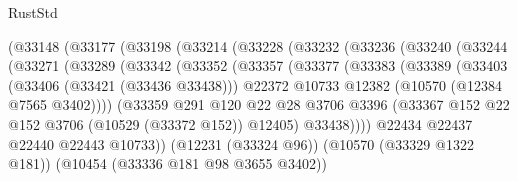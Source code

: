 \begin{lexlean}{RustStd}
\begin{coremodule}
                      (@33148
                        (@33177
                          (@33198
                            (@33214
                              (@33228
                                (@33232
                                  (@33236
                                    (@33240
                                      (@33244
                                        (@33271
                                          (@33289
                                            (@33342
                                              (@33352
                                                (@33357
                                                  (@33377
                                                    (@33383
                                                      (@33389
                                                        (@33403
                                                          (@33406 (@33421 (@33436 @33438)))
                                                          @22372
                                                          @10733
                                                          @12382
                                                          (@10570 (@12384 @7565 @3402))))
                                                      (@33359
                                                        @291
                                                        @120
                                                        @22
                                                        @28
                                                        @3706
                                                        @3396
                                                        (@33367
                                                          @152
                                                          @22
                                                          @152
                                                          @3706
                                                          (@10529 (@33372 @152))
                                                          @12405)
                                                        @33438))))
                                                @22434
                                                @22437
                                                @22440
                                                @22443
                                                @10733))
                                            (@12231 (@33324 @96))
                                            (@10570 (@33329 @1322 @181))
                                            (@10454 (@33336 @181 @98 @3655 @3402))

\end{coremodule}
\end{lexlean}
